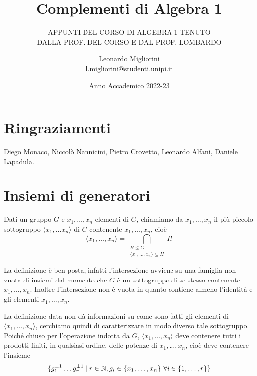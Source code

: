 \documentclass[11pt]{scrartcl}
\begin{document}
\title{Complementi di Algebra 1}
\subtitle{\large\normalfont\rmfamily\scshape APPUNTI DEL CORSO DI ALGEBRA 1 TENUTO\\ DALLA PROF. DEL CORSO E DAL PROF. LOMBARDO}
\author{Leonardo Migliorini \\ \textnormal{\href{l.migliorini@studenti.unipi.it}{l.migliorini@studenti.unipi.it}}}
\date{Anno Accademico 2022-23}
\maketitle
\newpage

\tableofcontents
\eject
\newpage

\section*{Ringraziamenti}

Diego Monaco, Niccolò Nannicini, Pietro Crovetto, Leonardo Alfani, Daniele
Lapadula.

\newpage
\section{Insiemi di generatori}

\begin{definition}
    Dati un gruppo $G$ e $x_1, \ldots, x_n$ elementi di $G$, chiamiamo  da $x_1, \ldots, x_n$ il più piccolo sottogruppo $\langle x_1, \ldots x_n
    \rangle$ di $G$ contenente $x_1, \ldots, x_n$, cioè \[\langle x_1, \ldots, x_n\rangle =
    \bigcap_{\substack{H\leqslant G\\ \{x_1, \ldots, x_n\} \subseteq H}} H\] 
\end{definition}

\begin{remark}
    La definizione è ben posta, infatti l'intersezione avviene su una 
    famiglia non vuota di insiemi dal momento che $G$ è un sottogruppo di 
    se stesso contenente $x_1, \ldots, x_n$. Inoltre l'intersezione non è vuota in 
    quanto contiene almeno l'identità e gli elementi $x_1, \ldots, x_n$.
\end{remark}

La definizione data non dà informazioni su come sono fatti gli elementi di 
$\langle x_1, \ldots, x_n\rangle$, cerchiamo quindi di caratterizzare in modo
diverso tale sottogruppo. Poiché chiuso per l'operazione indotta da $G$, $\langle x_1, \ldots, x_n\rangle$
deve contenere tutti i prodotti finiti, in qualsiasi ordine, delle potenze di
$x_1, \ldots, x_n$, cioè deve contenere l'insieme 
\[\{g_1^{\pm 1} \ldots g_r^{\pm 1}\mid r \in \mathbb N, g_i \in \{x_1, \ldots, x_n\}
~\forall i \in \{1, \ldots, r\}\}\]
\end{document}
